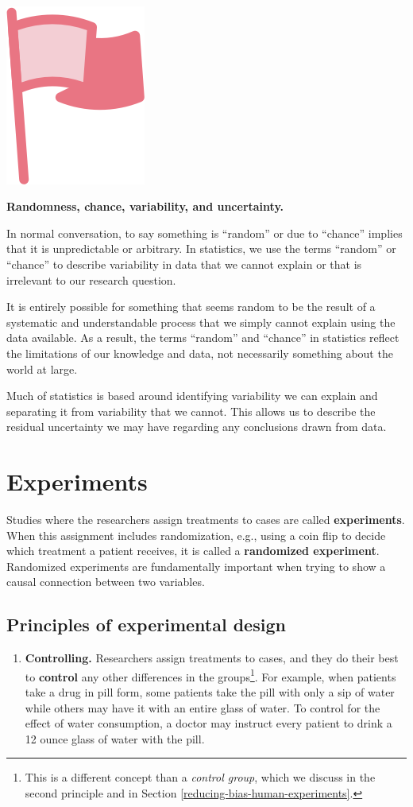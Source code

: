 \documentclass[
  10pt,
  openany]{book}
\providecommand{\tightlist}{%
  \setlength{\itemsep}{0pt}\setlength{\parskip}{0pt}}
\newenvironment{mdframedwithfootImportant}
{   
    \savenotes
    \begin{mdframed}[%
    topline=true, bottomline=true, linecolor=oiR, linewidth=0.5pt,
    rightline=false, leftline=false,
    backgroundcolor=oiLGray]
    \renewcommand{\thempfootnote}{\arabic{footnote}}
    }
{
    \end{mdframed}
    \spewnotes
}
\newenvironment{important}{
    \let\oldtextbf\textbf
    \renewcommand{\textbf}[1]{{\textcolor{oiR}{\oldtextbf{##1}}}}
\vspace{4mm}
\begin{mdframedwithfootImportant}
\begin{minipage}[t]{0.10\textwidth}
{$\:$ \\ \setkeys{Gin}{width=2.5em,keepaspectratio}\includegraphics{images/_icons/important.png}}
\end{minipage}
\hfill
\begin{minipage}[t]{0.90\textwidth}
\vspace{-2mm}
\setlength{\parskip}{1em}
}{\end{minipage}
\end{mdframedwithfootImportant}
\vspace{4mm}
}
\begin{document}
\begin{important}
\textbf{Randomness, chance, variability, and uncertainty.}

In normal conversation, to say something is ``random'' or due to ``chance'' implies that it is unpredictable or arbitrary. In statistics, we use the terms ``random'' or ``chance'' to describe variability in data that we cannot explain or that is irrelevant to our research question.

It is entirely possible for something that seems random to be the result of a systematic and understandable process that we simply cannot explain using the data available. As a result, the terms ``random'' and ``chance'' in statistics reflect the limitations of our knowledge and data, not necessarily something about the world at large.

Much of statistics is based around identifying variability we can explain and separating it from variability that we cannot. This allows us to describe the residual uncertainty we may have regarding any conclusions drawn from data.

\end{important}

\hypertarget{experiments}{%
\section{Experiments}\label{experiments}}

Studies where the researchers assign treatments to cases are called \textbf{experiments}.
When this assignment includes randomization, e.g., using a coin flip to decide which treatment a patient receives, it is called a \textbf{randomized experiment}.
Randomized experiments are fundamentally important when trying to show a causal connection between two variables.

\hypertarget{principles-of-experimental-design}{%
\subsection{Principles of experimental design}\label{principles-of-experimental-design}}

\begin{enumerate}
\def\labelenumi{\arabic{enumi}.}
\tightlist
\item
  \textbf{Controlling.} Researchers assign treatments to cases, and they do their best to \textbf{control} any other differences in the groups\footnote{This is a different concept than a \emph{control group}, which we discuss in the second principle and in Section \ref{reducing-bias-human-experiments}.}. For example, when patients take a drug in pill form, some patients take the pill with only a sip of water while others may have it with an entire glass of water. To control for the effect of water consumption, a doctor may instruct every patient to drink a 12 ounce glass of water with the pill.
\end{enumerate}
\end{document}
